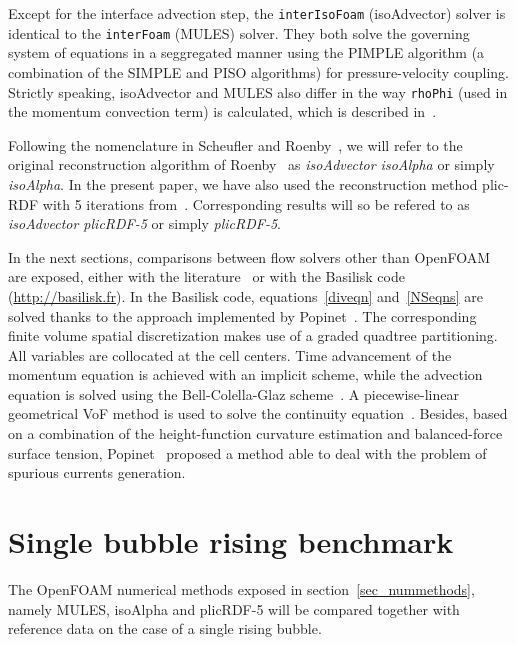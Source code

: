 \documentclass[review]{elsarticle}
\begin{document}
Except for the interface advection step, the \verb+interIsoFoam+ (isoAdvector) solver is identical to the \verb+interFoam+ (MULES) solver. They both solve the governing system of equations in a seggregated manner using the PIMPLE algorithm (a combination of the SIMPLE and PISO algorithms) for pressure-velocity coupling. Strictly speaking, isoAdvector and MULES also differ in the way \verb+rhoPhi+ (used in the momentum convection term) is calculated, which is described in~\cite{roenby_isoadvector:_2018}.

Following the nomenclature in Scheufler and Roenby~\cite{Scheufler2018}, we will refer to the original reconstruction algorithm of Roenby~\cite{Roenby160405} as {\em{isoAdvector isoAlpha}} or simply {\em{isoAlpha}}. In the present paper, we have also used the reconstruction method plic-RDF with 5 iterations from~\cite{Scheufler2018}. Corresponding results will so be refered to as {\em{isoAdvector plicRDF-5}} or simply {\em{plicRDF-5}}.

In the next sections, comparisons between flow solvers other than OpenFOAM are exposed, either with the literature~\cite{Hysing2009} or with the Basilisk code (\url{http://basilisk.fr}). In the Basilisk code, equations~\ref{diveqn} and~\ref{NSeqns} are solved thanks to the approach implemented by Popinet~\citep{popinet2015}. The corresponding finite volume spatial discretization makes use of a graded quadtree partitioning. All variables are collocated at the cell centers. Time advancement of the momentum equation is achieved with an implicit scheme, while the advection equation is solved using the Bell-Colella-Glaz scheme~\cite{bell1989}. A piecewise-linear geometrical VoF method is used to solve the continuity equation~\cite{popinet2009}. Besides, based on a combination of the height-function curvature estimation and balanced-force surface tension, Popinet~\cite{popinet2009} proposed a method able to deal with the problem of spurious currents generation.

\section{Single bubble rising benchmark}\label{sec_hysingcase}

The OpenFOAM numerical methods exposed in section~\ref{sec_nummethods}, namely MULES, isoAlpha and plicRDF-5 will be compared together with reference data on the case of a single rising bubble. 
\end{document}
